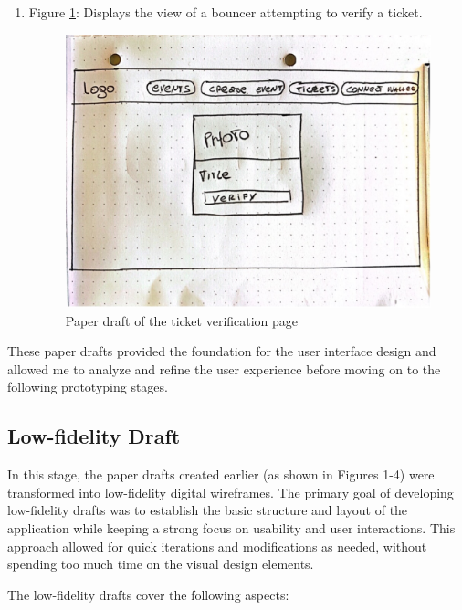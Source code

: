 \begin{enumerate}
    \item Figure \ref{Abb6}: Displays the view of a bouncer attempting to verify a ticket.\\
    \begin{figure}[H]
    \centering
    \includegraphics[width=0.5\linewidth]{PICs/Picture4.jpg}
    \caption{Paper draft of the ticket verification page}\label{Abb6}
    \end{figure}
\end{enumerate}

These paper drafts provided the foundation for the user interface design and allowed me to analyze and refine the user experience before moving on to the following prototyping stages.

\subsection{Low-fidelity Draft}
In this stage, the paper drafts created earlier (as shown in Figures 1-4) were transformed into low-fidelity digital wireframes. The primary goal of developing low-fidelity drafts was to establish the basic structure and layout of the application while keeping a strong focus on usability and user interactions. This approach allowed for quick iterations and modifications as needed, without spending too much time on the visual design elements.

The low-fidelity drafts cover the following aspects:

